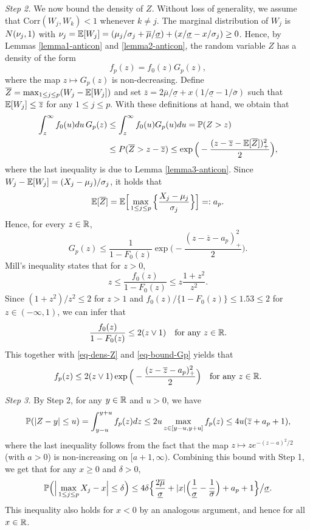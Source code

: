 \documentclass[a4paper,12pt]{article}
\numberwithin{equation}{section}
\begin{document}
\textit{Step 2.} We now bound the density of $Z$. Without loss of generality, we assume that $\text{Corr}(W_j,W_k) < 1$ whenever $k \ne j$. The marginal distribution of $W_j$ is $N(\nu_j,1)$ with $\nu_j = \mathbb{E}[W_j] = (\mu_j/\sigma_j + \overline{\mu}/{\underline{\sigma}}) + (x/\underline{\sigma} - x/\sigma_j) \ge 0$. Hence, by Lemmas \ref{lemma1-anticon} and \ref{lemma2-anticon}, the random variable $Z$ has a density of the form
\begin{equation}\label{eq-dens-Z}
f_p(z) = f_0(z) G_p(z), 
\end{equation}
where the map $z \mapsto G_p(z)$ is non-decreasing. Define $\overline{Z} = \max_{1 \le j \le p} (W_j - \mathbb{E}[W_j])$ and set $\overline{z} = 2 \overline{\mu}/\underline{\sigma} + x(1/\underline{\sigma} - 1/\overline{\sigma})$ such that $\mathbb{E}[W_j] \le \overline{z}$ for any $1 \le j \le p$. With these definitions at hand, we obtain that  
\begin{align*}
\int_z^{\infty} f_0(u)du \, G_p(z) & \le \int_z^{\infty} f_0(u) G_p(u) du = \mathbb{P}(Z > z) \\ 
 & \le P(\overline{Z} > z - \overline{z}) \le \exp \Big( - \frac{(z - \overline{z} - \mathbb{E}[\overline{Z}])^2_+}{2} \Big), 
\end{align*}
where the last inequality is due to Lemma \ref{lemma3-anticon}. Since $W_j - \mathbb{E}[W_j] = (X_j - \mu_j)/\sigma_j$, it holds that 
\[ \mathbb{E}[\overline{Z}] = \mathbb{E} \Big[ \max_{1 \le j \le p} \Big\{ \frac{X_j-\mu_j}{\sigma_j} \Big\} \Big] =: a_p. \]
Hence, for every $z \in \mathbb{R}$, 
\begin{equation}\label{eq-bound-Gp}
G_p(z) \le \frac{1}{1 - F_0(z)} \exp\Big( - \frac{(z - \overline{z} - a_p)_+^2}{2} \Big). 
\end{equation}
Mill's inequality states that for $z > 0$, 
\[ z \le \frac{f_0(z)}{1-F_0(z)} \le z \frac{1+z^2}{z^2}. \]
Since $(1+z^2)/z^2 \le 2$ for $z > 1$ and $f_0(z)/\{1-F_0(z)\} \le 1.53 \le 2$ for $z \in (-\infty,1)$, we can infer that
\[ \frac{f_0(z)}{1-F_0(z)} \le 2 (z \vee 1) \quad \text{for any } z \in \mathbb{R}. \]
This together with \eqref{eq-dens-Z} and \eqref{eq-bound-Gp} yields that
\[ f_p(z) \le 2 (z \vee 1)  \exp\Big( - \frac{(z - \overline{z} - a_p)_+^2}{2} \Big) \quad \text{for any } z \in \mathbb{R}. \]
\vspace{1pt}
 

\textit{Step 3.} By Step 2, for any $y \in \mathbb{R}$ and $u > 0$, we have
\[ \mathbb{P}( |Z - y| \le u) = \int_{y - u}^{y + u} f_p(z) dz \le 2u \max_{z \in [y-u,y+u]} f_p(z) \le 4u (\overline{z} + a_p + 1), \] 
where the last inequality follows from the fact that the map $z \mapsto z e^{-(z-a)^2/2}$ (with $a > 0$) is non-increasing on $[a+1,\infty)$. Combining this bound with Step 1, we get that for any $x \ge 0$ and $\delta > 0$, 
\begin{equation}\label{eq-bound1-Levy}
\mathbb{P} \Big( \Big| \max_{1 \le j \le p} X_j - x \Big| \le \delta \Big) \le 4\delta \Big\{ \frac{2\overline{\mu}}{\underline{\sigma}} + |x| \Big(\frac{1}{\underline{\sigma}} - \frac{1}{\overline{\sigma}}\Big) + a_p + 1 \Big\} \big/ \underline{\sigma}. 
\end{equation} 
This inequality also holds for $x < 0$ by an analogous argument, and hence for all $x \in \mathbb{R}$. 
\end{document}
